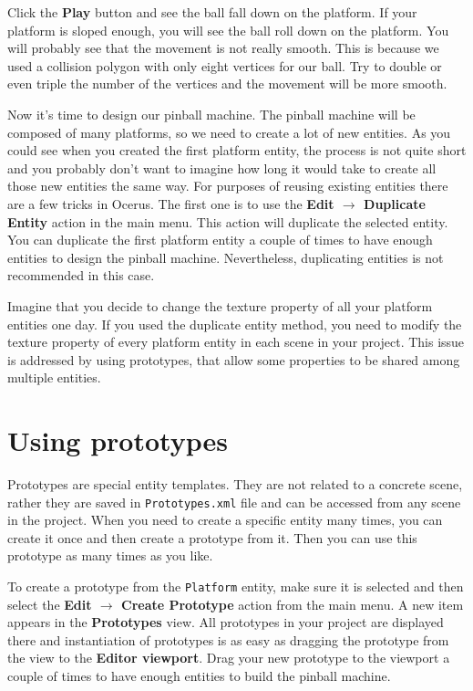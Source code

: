 \documentclass[a4paper,12pt]{article}
\begin{document}
Click the \textbf{Play} button and see the ball fall down on the platform. If your platform is sloped enough, you will see the ball roll down on the platform. You will probably see that the movement is not really smooth. This is because we used a collision polygon with only eight vertices for our ball. Try to double or even triple the number of the vertices and the movement will be more smooth.
 
Now it's time to design our pinball machine. The pinball machine will be composed of many platforms, so we need to create a lot of new entities. As you could see when you created the first platform entity, the process is not quite short and you probably don't want to imagine how long it would take to create all those new entities the same way. For purposes of reusing existing entities there are a few tricks in Ocerus. The first one is to use the \textbf{Edit $\to$ Duplicate Entity} action in the main menu. This action will duplicate the selected entity. You can duplicate the first platform entity a couple of times to have enough entities to design the pinball machine. Nevertheless, duplicating entities is not recommended in this case. 

Imagine that you decide to change the texture property of all your platform entities one day. If you used the duplicate entity method, you need to modify the texture property of every platform entity in each scene in your project. This issue is addressed by using prototypes, that allow some properties to be shared among multiple entities.

\section{Using prototypes}
Prototypes are special entity templates. They are not related to a concrete scene, rather they are saved in \texttt{Prototypes.xml} file and can be accessed from any scene in the project. When you need to create a specific entity many times, you can create it once and then create a prototype from it. Then you can use this prototype as many times as you like.

To create a prototype from the \texttt{Platform} entity, make sure it is selected and then select the \textbf{Edit $\to$ Create Prototype} action from the main menu. A new item appears in the \textbf{Prototypes} view. All prototypes in your project are displayed there and instantiation of prototypes is as easy as dragging the prototype from the view to the \textbf{Editor viewport}. Drag your new prototype to the viewport a couple of times to have enough entities to build the pinball machine.
\end{document}
